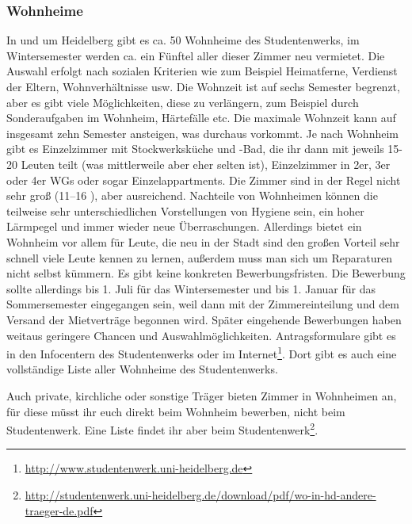 \subsubsection{Wohnheime}
In und um Heidelberg gibt es ca. 50 Wohnheime des Studentenwerks, im Wintersemester
werden ca. ein Fünftel aller dieser Zimmer neu vermietet. Die Auswahl erfolgt nach
sozialen Kriterien wie zum Beispiel Heimatferne, Verdienst der Eltern,
Wohnverhältnisse usw. Die Wohnzeit ist auf sechs Semester begrenzt, aber es gibt
viele Möglichkeiten, diese zu verlängern, zum Beispiel durch Sonderaufgaben im
Wohnheim, Härtefälle etc. Die maximale Wohnzeit kann auf insgesamt zehn Semester ansteigen, was
durchaus vorkommt. Je nach Wohnheim gibt es Einzelzimmer mit Stockwerksküche und
-Bad, die ihr dann mit jeweils 15-20 Leuten teilt (was mittlerweile aber eher selten
ist), Einzelzimmer in 2er, 3er oder 4er WGs oder sogar Einzelappartments. Die Zimmer
sind in der Regel nicht sehr groß (11--16 \squaren\metre), aber ausreichend. Nachteile von
Wohnheimen können die teilweise sehr unterschiedlichen Vorstellungen von Hygiene
sein, ein hoher Lärmpegel und immer wieder neue Überraschungen. Allerdings bietet
ein Wohnheim vor allem für Leute, die neu in der Stadt sind den großen Vorteil sehr
schnell viele Leute kennen zu lernen, außerdem muss man sich um Reparaturen nicht
selbst kümmern. Es gibt keine konkreten Bewerbungsfristen. Die Bewerbung sollte
allerdings bis 1. Juli für das Wintersemester und bis 1. Januar für das
Sommersemester eingegangen sein, weil dann mit der Zimmereinteilung und dem Versand
der Mietverträge begonnen wird. Später eingehende Bewerbungen haben weitaus
geringere Chancen und Auswahlmöglichkeiten. Antragsformulare gibt es in den
Infocentern des Studentenwerks oder im Internet\footnote{\url{http://www.studentenwerk.uni-heidelberg.de}}.
Dort gibt es auch eine vollständige Liste aller Wohnheime des Studentenwerks.

Auch private, kirchliche oder sonstige Träger bieten Zimmer in Wohnheimen an, für
diese müsst ihr euch direkt beim Wohnheim bewerben, nicht beim Studentenwerk. Eine
Liste findet ihr aber beim Studentenwerk\footnote{\url{http://studentenwerk.uni-heidelberg.de/download/pdf/wo-in-hd-andere-traeger-de.pdf}}.

